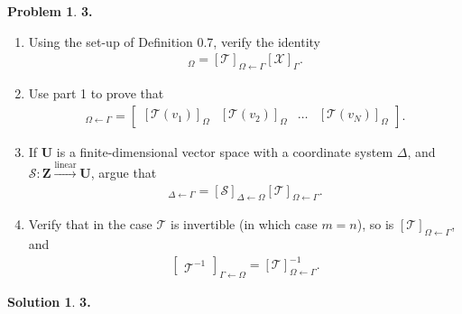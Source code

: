 \documentclass{article}
\theoremstyle{definition}
\newtheorem*{prob*}{Problem}
\newtheorem*{sln*}{Solution}
\newcommand{\Z}{\mathbf{Z}}
\newcommand{\U}{\mathbf{U}}
\begin{document}
\newpage



\begin{prob*}\textbf{3.}
	\begin{enumerate}
		\item Using the set-up of Definition 0.7, verify the identity
		\begin{align*}
		[\mathcal{T(X)}]_\Omega = [\mathcal{T}]_{\Omega \leftarrow \Gamma}[\mathcal{X}]_\Gamma.
		\end{align*}
		
		
		
		\item Use part 1 to prove that 
		\begin{align*}
		[\mathcal{T}]_{\Omega\leftarrow\Gamma} = \begin{bmatrix}
		[\mathcal{T}(v_1)]_\Omega & [\mathcal{T}(v_2)]_\Omega & \dots & [\mathcal{T}(v_N)]_\Omega  
		\end{bmatrix}.
		\end{align*}
		
		
		
		\item If $\U$ is a finite-dimensional vector space with a coordinate system $\Delta$, and $\mathcal{S} : \Z \overset{\text{linear}}{\longrightarrow} \U$, argue that 
		\begin{align*}
		[\mathcal{S}\circ \mathcal{T}]_{\Delta \leftarrow \Gamma} = [\mathcal{S}]_{\Delta \leftarrow \Omega}[\mathcal{T}]_{\Omega\leftarrow\Gamma}.
		\end{align*}
		
		
		\item Verify that in the case $\mathcal{T}$ is invertible (in which case $m=n$), so is $[\mathcal{T}]_{\Omega\leftarrow \Gamma}$, and 
		\begin{align*}
		\begin{bmatrix}
		\mathcal{T}^{-1}
		\end{bmatrix}_{\Gamma\leftarrow\Omega} = [\mathcal{T}]^{-1}_{\Omega\leftarrow \Gamma}.
		\end{align*}
	\end{enumerate}

	
	
	
	\begin{sln*}\textbf{3.}
		\begin{enumerate}
			

\end{enumerate}
\end{sln*}
\end{prob*}
\end{document}
